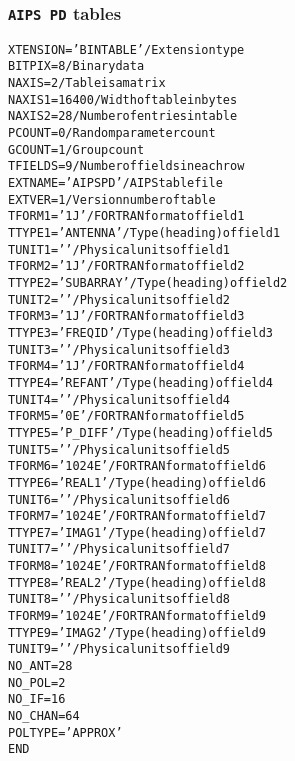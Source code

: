 \documentclass[twoside]{article}
\begin{document}
\subsubsection{{\tt AIPS PD} tables}
\label{Appe:PDtable}
\begin{alltt}
XTENSION= 'BINTABLE'           / Extension type
BITPIX  =                    8 / Binary data
NAXIS   =                    2 / Table is a matrix
NAXIS1  =                16400 / Width of table in bytes
NAXIS2  =                   28 / Number of entries in table
PCOUNT  =                    0 / Random parameter count
GCOUNT  =                    1 / Group count
TFIELDS =                    9 / Number of fields in each row
EXTNAME = 'AIPS PD '           / AIPS table file
EXTVER  =                    1 / Version number of table
TFORM1  = '1J      '           / FORTRAN format of field  1
TTYPE1  = 'ANTENNA         '   / Type (heading) of field  1
TUNIT1  = '        '           / Physical units of field  1
TFORM2  = '1J      '           / FORTRAN format of field  2
TTYPE2  = 'SUBARRAY        '   / Type (heading) of field  2
TUNIT2  = '        '           / Physical units of field  2
TFORM3  = '1J      '           / FORTRAN format of field  3
TTYPE3  = 'FREQ ID         '   / Type (heading) of field  3
TUNIT3  = '        '           / Physical units of field  3
TFORM4  = '1J      '           / FORTRAN format of field  4
TTYPE4  = 'REFANT          '   / Type (heading) of field  4
TUNIT4  = '        '           / Physical units of field  4
TFORM5  = '0E      '           / FORTRAN format of field  5
TTYPE5  = 'P_DIFF          '   / Type (heading) of field  5
TUNIT5  = '        '           / Physical units of field  5
TFORM6  = '1024E   '           / FORTRAN format of field  6
TTYPE6  = 'REAL 1          '   / Type (heading) of field  6
TUNIT6  = '        '           / Physical units of field  6
TFORM7  = '1024E   '           / FORTRAN format of field  7
TTYPE7  = 'IMAG 1          '   / Type (heading) of field  7
TUNIT7  = '        '           / Physical units of field  7
TFORM8  = '1024E   '           / FORTRAN format of field  8
TTYPE8  = 'REAL 2          '   / Type (heading) of field  8
TUNIT8  = '        '           / Physical units of field  8
TFORM9  = '1024E   '           / FORTRAN format of field  9
TTYPE9  = 'IMAG 2          '   / Type (heading) of field  9
TUNIT9  = '        '           / Physical units of field  9
NO_ANT  =           28
NO_POL  =            2
NO_IF   =           16
NO_CHAN =           64
POLTYPE = 'APPROX  '
END
\end{alltt}
\end{document}
